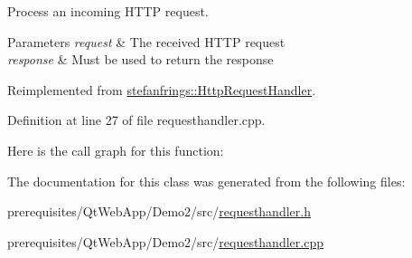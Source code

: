Process an incoming H\+T\+TP request. 
\begin{DoxyParams}{Parameters}
{\em request} & The received H\+T\+TP request \\
\hline
{\em response} & Must be used to return the response \\
\hline
\end{DoxyParams}


Reimplemented from \mbox{\hyperlink{classstefanfrings_1_1_http_request_handler_a0a7210907152c46b8b5a47feb64cf6bd}{stefanfrings\+::\+Http\+Request\+Handler}}.



Definition at line 27 of file requesthandler.\+cpp.

Here is the call graph for this function\+:


The documentation for this class was generated from the following files\+:\begin{DoxyCompactItemize}
\item 
prerequisites/\+Qt\+Web\+App/\+Demo2/src/\mbox{\hyperlink{_demo2_2src_2requesthandler_8h}{requesthandler.\+h}}\item 
prerequisites/\+Qt\+Web\+App/\+Demo2/src/\mbox{\hyperlink{_demo2_2src_2requesthandler_8cpp}{requesthandler.\+cpp}}\end{DoxyCompactItemize}
